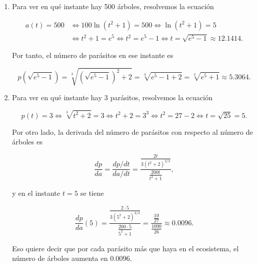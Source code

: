 \documentclass[
  a4paper,
]{scrreport}
\theoremstyle{definition}
\theoremstyle{remark}
\begin{document}
\begin{tcolorbox}[enhanced jigsaw, coltitle=black, toptitle=1mm, colframe=quarto-callout-tip-color-frame, colbacktitle=quarto-callout-tip-color!10!white, breakable, opacityback=0, bottomtitle=1mm, opacitybacktitle=0.6, title=\textcolor{quarto-callout-tip-color}{\faLightbulb}\hspace{0.5em}{Solución}, arc=.35mm, leftrule=.75mm, toprule=.15mm, titlerule=0mm, bottomrule=.15mm, left=2mm, rightrule=.15mm, colback=white]

\begin{enumerate}
\def\labelenumi{\alph{enumi}.}
\item
  Para ver en qué instante hay 500 árboles, resolvemos la ecuación

  \begin{align*}
  a(t) = 500 
  &\Leftrightarrow 100\ln(t^2+1) = 500
  \Leftrightarrow \ln(t^2+1) = 5 \\
  &\Leftrightarrow t^2+1 = e^5
  \Leftrightarrow t^2 = e^5-1
  \Leftrightarrow t = \sqrt{e^5-1}
  \approx 12.1414.
  \end{align*}

  Por tanto, el número de parásitos en ese instante es

  \[
  p(\sqrt{e^5-1})
  = \sqrt[3]{(\sqrt{e^5-1})^2  + 2}
  = \sqrt[3]{e^5-1  + 2}
  = \sqrt[3]{e^5+1}
  \approx 5.3064. 
  \]
\item
  Para ver en qué instante hay 3 parásitos, resolvemos la ecuación

  \[
  p(t) = 3 
  \Leftrightarrow \sqrt[3]{t^2+2} = 3
  \Leftrightarrow t^2+2 = 3^3
  \Leftrightarrow t^2 = 27-2
  \Leftrightarrow t = \sqrt{25}
  = 5.
  \]

  Por otro lado, la derivada del número de parásitos con respecto al
  número de árboles es

  \[
  \frac{dp}{da}
  = \frac{dp/dt}{da/dt}
  = \frac{\frac{2t}{3(t^2+2)^{2/3}}}{\frac{200t}{t^2+1}},
  \]

  y en el instante \(t=5\) se tiene

  \[
  \frac{dp}{da}(5) 
  = \frac{\frac{2\cdot 5}{3(5^2+2)^{2/3}}}{\frac{200\cdot 5}{5^2+1}}
  = \frac{\frac{10}{27}}{\frac{1000}{26}}
  \approx 0.0096.
  \]

  Eso quiere decir que por cada parásito más que haya en el ecosistema,
  el número de árboles aumenta en \(0.0096\).
\end{enumerate}

\end{tcolorbox}
\end{document}
